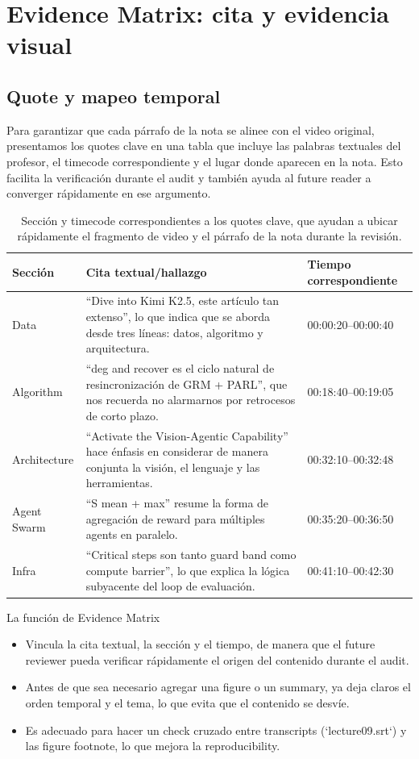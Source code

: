\section{Evidence Matrix: cita y evidencia visual}

\subsection{Quote y mapeo temporal}
\label{sec:evidence-quotes}
Para garantizar que cada párrafo de la nota se alinee con el video original, presentamos los quotes clave en una tabla que incluye las palabras textuales del profesor, el timecode correspondiente y el lugar donde aparecen en la nota. Esto facilita la verificación durante el audit y también ayuda al future reader a converger rápidamente en ese argumento.

\begin{table}[H]
\footnotesize
\centering
\begin{tabular}{p{3cm}p{4cm}p{5cm}}
\toprule
Sección & Cita textual/hallazgo & Tiempo correspondiente \\
\midrule
Data & ``Dive into Kimi K2.5, este artículo tan extenso'', lo que indica que se aborda desde tres líneas: datos, algoritmo y arquitectura. & 00:00:20--00:00:40 \\
Algorithm & ``deg and recover es el ciclo natural de resincronización de GRM + PARL'', que nos recuerda no alarmarnos por retrocesos de corto plazo. & 00:18:40--00:19:05 \\
Architecture & ``Activate the Vision-Agentic Capability'' hace énfasis en considerar de manera conjunta la visión, el lenguaje y las herramientas. & 00:32:10--00:32:48 \\
Agent Swarm & ``S mean + max'' resume la forma de agregación de reward para múltiples agents en paralelo. & 00:35:20--00:36:50 \\
Infra & ``Critical steps son tanto guard band como compute barrier'', lo que explica la lógica subyacente del loop de evaluación. & 00:41:10--00:42:30 \\
\bottomrule
\end{tabular}
\caption{Sección y timecode correspondientes a los quotes clave, que ayudan a ubicar rápidamente el fragmento de video y el párrafo de la nota durante la revisión.}
\end{table}

\begin{knowledgebox}{La función de Evidence Matrix}
\begin{itemize}
    \item Vincula la cita textual, la sección y el tiempo, de manera que el future reviewer pueda verificar rápidamente el origen del contenido durante el audit.
    \item Antes de que sea necesario agregar una figure o un summary, ya deja claros el orden temporal y el tema, lo que evita que el contenido se desvíe.
    \item Es adecuado para hacer un check cruzado entre transcripts (`lecture09.srt`) y las figure footnote, lo que mejora la reproducibility.
\end{itemize}
\end{knowledgebox}

